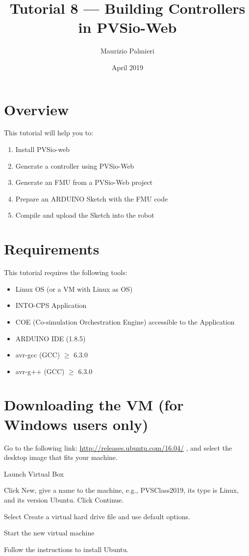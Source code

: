 \documentclass[11pt,a4paper]{../tutorial}
\title{Tutorial 8 --- Building Controllers in PVSio-Web}
\date{April 2019}
\author{Maurizio Palmieri}
\begin{document}
\section*{Overview}

This tutorial will help you to:

\begin{enumerate}[noitemsep]
\item Install PVSio-web
\item Generate a  controller using PVSio-Web
\item Generate an FMU from a PVSio-Web project
\item Prepare an ARDUINO Sketch with the FMU code 
\item Compile and upload the Sketch into the robot 
\end{enumerate}

\section*{Requirements}

This tutorial requires the following tools:

\begin{itemize}[noitemsep]
\item Linux OS (or a VM with Linux as OS)
\item INTO-CPS Application
\item COE (Co-simulation Orchestration Engine) accessible to the Application
\item ARDUINO IDE (1.8.5) 
\item avr-gcc (GCC) $\geq$ 6.3.0
\item avr-g++ (GCC) $\geq$ 6.3.0   

\end{itemize}




\section{Downloading the VM (for Windows users only)}
\begin{instructions}
\item Go to the following link: \url{http://releases.ubuntu.com/16.04/} , and select the desktop image that fits your machine.
\item Launch Virtual Box
\item Click New, give a name to the machine, e.g., PVSClass2019, its type is Linux, and its version Ubuntu. Click Continue.
\item Select Create a virtual hard drive file and use default options.
\item  Start the new virtual machine
\item Follow the instructions to install Ubuntu.

\end{instructions}
\end{document}
